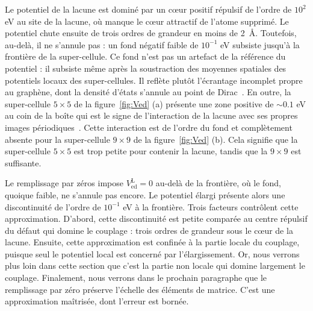 Le potentiel de la lacune est dominé par un cœur positif répulsif de l'ordre de $10^2$ eV au site de la lacune, où manque le cœur attractif de l'atome supprimé. Le potentiel chute ensuite de trois ordres de grandeur en moins de 2~\AA{}. Toutefois, au-delà, il ne s'annule pas : un fond négatif faible de $10^{-1}$ eV subsiste jusqu'à la frontière de la super-cellule. Ce fond n'est pas un artefact de la référence du potentiel : il subsiste même après la soustraction des moyennes spatiales des potentiels locaux des super-cellules. Il reflète plutôt l'écrantage incomplet propre au graphène, dont la densité d'états s'annule au point de Dirac~\cite{castronetoElectronicPropertiesGraphene2009}. En outre, la super-cellule $5\times 5$ de la figure~\ref{fig:Ved} (a) présente une zone positive de $\sim 0.1$ eV au coin de la boîte qui est le signe de l'interaction de la lacune avec ses propres images périodiques~\cite{freysoldtFirstprinciplesCalculationsPoint2014}. Cette interaction est de l'ordre du fond et complètement absente pour la super-cellule $9\times 9$ de la figure~\ref{fig:Ved} (b). Cela signifie que la super-cellule $5\times 5$ est trop petite pour contenir la lacune, tandis que la $9\times 9$ est suffisante.

Le remplissage par zéros impose $V_\text{ed}^\text{L} = 0$ au-delà de la frontière, où le fond, quoique faible, ne s'annule pas encore. Le potentiel élargi présente alors une discontinuité de l'ordre de $10^{-1}$ eV à la frontière. Trois facteurs contrôlent cette approximation. D'abord, cette discontinuité est petite comparée au centre répulsif du défaut qui domine le couplage : trois ordres de grandeur sous le cœur de la lacune. Ensuite, cette approximation est confinée à la partie locale du couplage, puisque seul le potentiel local est concerné par l'élargissement. Or, nous verrons plus loin dans cette section que c'est la partie non locale qui domine largement le couplage. Finalement, nous verrons dans le prochain paragraphe que le remplissage par zéro préserve l'échelle des éléments de matrice. C'est une approximation maîtrisée, dont l'erreur est bornée.


